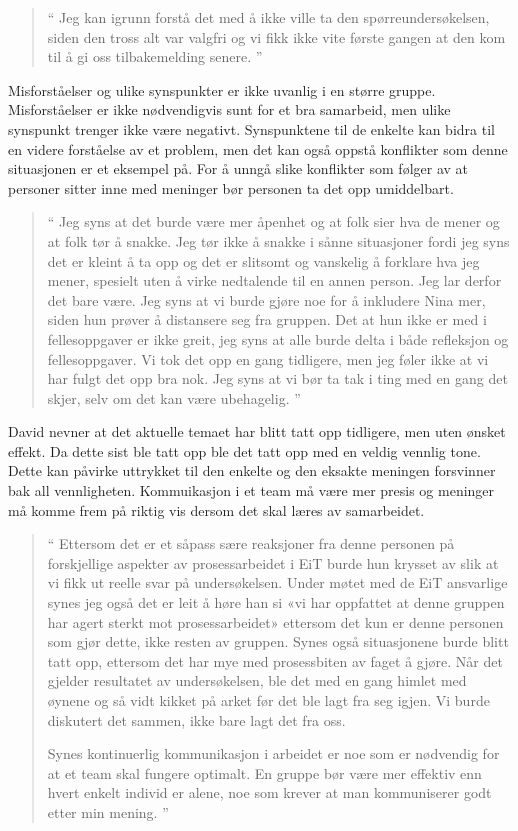 \begin{quote}``
Jeg kan igrunn forstå det med å ikke ville ta den spørreundersøkelsen, siden den 
tross alt var valgfri og vi fikk ikke vite første gangen at den kom til å gi oss tilbakemelding senere.
''\end{quote} 

Misforståelser og ulike synspunkter er ikke uvanlig i en større gruppe. Misforståelser er ikke nødvendigvis sunt for
et bra samarbeid, men ulike synspunkt trenger ikke være negativt. Synspunktene til de enkelte kan bidra til en videre
forståelse av et problem, men det kan også oppstå konflikter som denne situasjonen er et eksempel på.
For å unngå slike konflikter som følger av at personer sitter inne med meninger bør personen ta det opp umiddelbart.

\begin{quote}``
Jeg syns at det burde være mer åpenhet og at folk sier hva de 
mener og at folk tør å snakke. Jeg tør ikke å snakke i sånne situasjoner fordi jeg syns det er kleint å ta opp og det 
er slitsomt og vanskelig å forklare hva jeg mener, spesielt uten å virke nedtalende til en annen person. Jeg lar derfor
det bare være. Jeg syns at vi burde gjøre noe for å inkludere Nina mer, siden hun prøver å distansere seg fra gruppen. 
Det at hun ikke er med i fellesoppgaver er ikke greit, jeg syns at alle burde delta i både refleksjon og 
fellesoppgaver. Vi tok det opp en gang tidligere, men jeg føler ikke at vi har fulgt det opp bra nok. Jeg syns at vi bør 
ta tak i ting med en gang det skjer, selv om det kan være ubehagelig.
''\end{quote} 

David nevner at det aktuelle temaet har blitt tatt opp tidligere, men uten ønsket effekt. Da dette sist ble tatt opp ble
det tatt opp med en veldig vennlig tone. Dette kan påvirke uttrykket til den enkelte og den eksakte meningen 
forsvinner bak all vennligheten. Kommuikasjon i et team må være mer presis og meninger må komme frem på
riktig vis dersom det skal læres av samarbeidet.  

\begin{quote}``
Ettersom det er et såpass sære reaksjoner fra denne personen på 
forskjellige aspekter av prosessarbeidet i EiT burde hun krysset av slik at vi fikk ut reelle svar på undersøkelsen. 
Under møtet med de EiT ansvarlige synes jeg også det er leit å høre han si «vi har oppfattet at denne gruppen har agert 
sterkt mot prosessarbeidet» ettersom det kun er denne personen som gjør dette, ikke resten av gruppen. Synes 
også situasjonene burde blitt tatt opp, ettersom det har mye med prosessbiten av faget å gjøre. Når det gjelder 
resultatet av undersøkelsen, ble det med en gang himlet med øynene og så vidt kikket på arket før det ble lagt fra 
seg igjen. Vi burde diskutert det sammen, ikke bare lagt det fra oss.

Synes kontinuerlig kommunikasjon i arbeidet er noe som er nødvendig for at et team skal fungere optimalt. En 
gruppe bør være mer effektiv enn hvert enkelt individ er alene, noe som krever at man kommuniserer godt etter min 
mening.
''\end{quote} 

